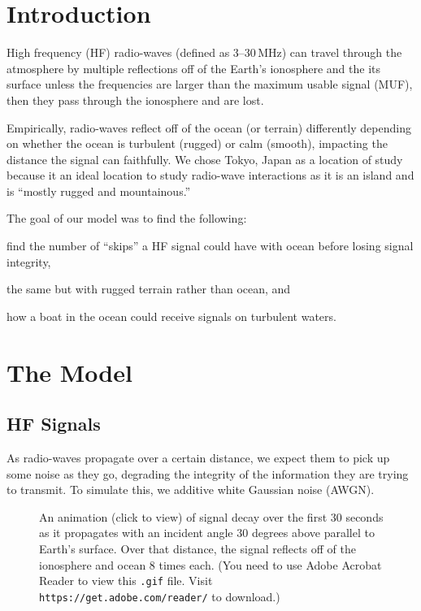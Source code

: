 \documentclass[11pt, twocolumn]{article}
\numberwithin{equation}{section}
\begin{document}
\section{Introduction} 
\label{sec: intro} 

High frequency (HF) radio-waves (defined as 3--30\,\si{\mega\hertz}) can travel through the atmosphere by multiple reflections off of the Earth's ionosphere and the its surface unless the frequencies are larger than the maximum usable signal (MUF), then they pass through the ionosphere and are lost.\cite{mcm_statement} 

Empirically, radio-waves reflect off of the ocean (or terrain) differently depending on whether the ocean is turbulent (rugged) or calm (smooth), impacting the distance the signal can faithfully.\cite{mcm_statement} We chose Tokyo, Japan as a location of study because it an ideal location to study radio-wave interactions as it is an island and is ``mostly rugged and mountainous.''\cite{factbook2010world}

The goal of our model was to find the following: 
\begin{enumerate*}[(1)]
    \item find the number of ``skips'' a HF signal could have with ocean before losing signal integrity, 
    \item the same but with rugged terrain rather than ocean, and
    \item how a boat in the ocean could receive signals on turbulent waters.
\end{enumerate*}


\section{The Model} %
\label{sec:model}

\subsection{HF Signals} %
\label{sub:radiowaves}

As radio-waves propagate over a certain distance, we expect them to pick up some noise as they go, degrading the integrity of the information they are trying to transmit. To simulate this, we additive white Gaussian noise (AWGN).\cite{shannon1984communication,kailath1968innovations}
 \begin{figure}
     \begin{center}
     \end{center}
     \caption{\small An animation (click to view) of signal decay over the first 30 seconds as it propagates with an incident angle 30 degrees above parallel to Earth’s surface. Over that distance, the signal reflects off of the ionosphere and ocean 8 times each. (You need to use Adobe Acrobat Reader to view this \texttt{.gif} file. Visit \texttt{https://get.adobe.com/reader/} to download.)}
 \end{figure}
\end{document}
